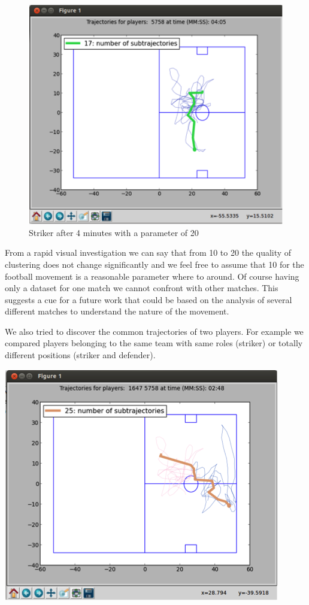 \documentclass{acm_proc_article-sp-sigmod07}
\begin{document}
\begin{figure}
\includegraphics{experimental5}
\caption{Striker after 4 minutes with a parameter of 20}
\end{figure}

From a rapid visual investigation we can say that from 10 to 20 the quality of clustering does not change significantly and we feel free to assume that 10 for the football movement is a reasonable parameter where to around. Of course having only a dataset for one match we cannot confront with other matches. This suggests a cue for a future work that could be based on the analysis of several different matches to understand the nature of the movement.  


We also tried to discover the common trajectories of two players. For example we compared players belonging to the same team with same roles (striker) or totally different positions (striker and defender).


\includegraphics{experimental6}
\end{document}
